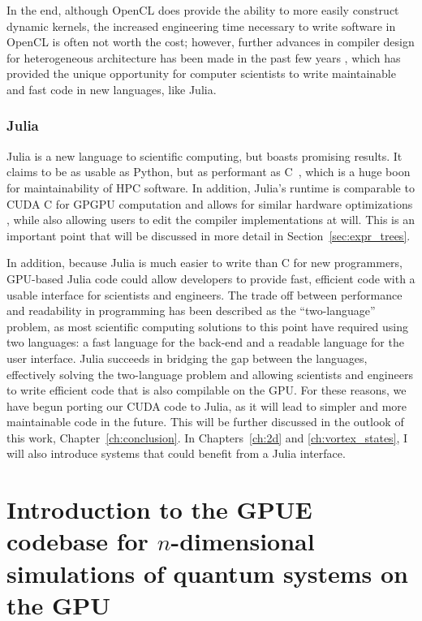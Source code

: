 In the end, although OpenCL does provide the ability to more easily construct dynamic kernels, the increased engineering time necessary to write software in OpenCL is often not worth the cost; however, further advances in compiler design for heterogeneous architecture has been made in the past few years \cite{besard2019}, which has provided the unique opportunity for computer scientists to write maintainable and fast code in new languages, like Julia.

\subsubsection{Julia}
Julia is a new language to scientific computing, but boasts promising results.
It claims to be as usable as Python, but as performant as C~\cite{bezanson2017}, which is a huge boon for maintainability of HPC software.
In addition, Julia's runtime is comparable to CUDA C for GPGPU computation and allows for similar hardware optimizations \cite{besard2016, besard2018}, while also allowing users to edit the compiler implementations at will.
This is an important point that will be discussed in more detail in Section~\ref{sec:expr_trees}.

In addition, because Julia is much easier to write than C for new programmers, GPU-based Julia code could allow developers to provide fast, efficient code with a usable interface for scientists and engineers.
The trade off between performance and readability in programming has been described as the ``two-language'' problem, as most scientific computing solutions to this point have required using two languages: a fast language for the back-end and a readable language for the user interface.
Julia succeeds in bridging the gap between the languages, effectively solving the two-language problem and allowing scientists and engineers to write efficient code that is also compilable on the GPU.
For these reasons, we have begun porting our CUDA code to Julia, as it will lead to simpler and more maintainable code in the future.
This will be further discussed in the outlook of this work, Chapter~\ref{ch:conclusion}.
In Chapters~\ref{ch:2d} and \ref{ch:vortex_states}, I will also introduce systems that could benefit from a Julia interface.

\section{Introduction to the GPUE codebase for $n$-dimensional simulations of quantum systems on the GPU}
\label{sec:GPUE}

